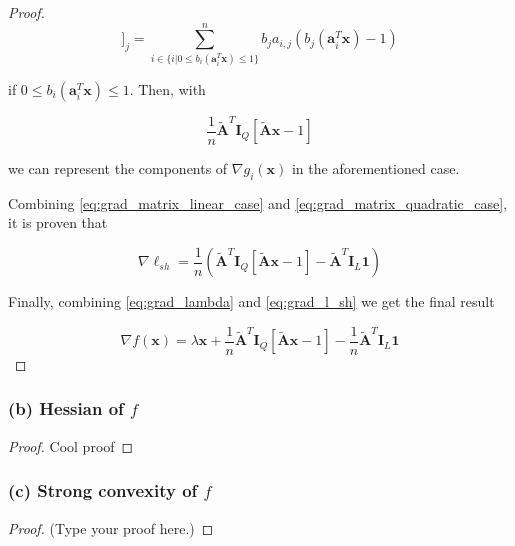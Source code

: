 \documentclass[12pt]{article}
\newcommand{\xb}{\mathbf{x}}
\newcommand{\ab}{\mathbf{a}}
\newcommand{\abi}{\ab_i}
\newcommand{\ellsh}{\ell_{sh}}
\newcommand{\ax}{\abi^T\xb}
\newcommand{\atilde}{\mathbf{\tilde{A}}}
\newcommand{\id}{\mathbf{I}}
\newcommand{\ones}{\mathbf{1}}
\begin{document}
\begin{proof}
\begin{equation*}
    [\atilde^T\id_Q[\atilde \xb - 1]]_j =
    \sum_{i \in \{i | 0 \leq b_i(\ax) \leq 1\}}^{n} b_j a_{i, j} (b_j(\ax) - 1)
\end{equation*}

if $0 \leq b_i(\ax) \leq 1$. Then, with 

\begin{equation} \label{eq:grad_matrix_quadratic_case}
    \frac{1}{n}\atilde^T\id_Q[\atilde \xb - 1]
\end{equation}

we can represent the components of $\nabla g_i(\xb)$ in the aforementioned case.

Combining \eqref{eq:grad_matrix_linear_case} and \eqref{eq:grad_matrix_quadratic_case}, it is proven that

\begin{equation} \label{eq:grad_l_sh}
    \nabla \ellsh = \frac{1}{n}(\atilde^T\id_Q[\atilde \xb - 1] - \atilde^T\id_L\ones)
\end{equation}

Finally, combining \eqref{eq:grad_lambda} and \eqref{eq:grad_l_sh} we get the final result

\begin{equation}
    \nabla f(\xb) = \lambda\xb + \frac{1}{n}\atilde^T\id_Q[\atilde \xb - 1] - \frac{1}{n}\atilde^T\id_L\ones
\end{equation}

\end{proof}

\subsubsection*{(b) Hessian of $f$}
\begin{proof}
Cool proof
\end{proof}

\subsubsection*{(c) Strong convexity of $f$}
\begin{proof}
(Type your proof here.)
\end{proof}
\end{document}
